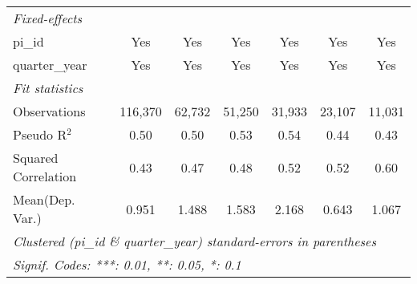 \begin{tabular}{lcccccc}
   \midrule
   \emph{Fixed-effects}\\
   pi\_id                                                     & Yes            & Yes           & Yes            & Yes            & Yes           & Yes\\  
   quarter\_year                                              & Yes            & Yes           & Yes            & Yes            & Yes           & Yes\\  
   \midrule
   \emph{Fit statistics}\\
   Observations                                               & 116,370        & 62,732        & 51,250         & 31,933         & 23,107        & 11,031\\  
   Pseudo R$^2$                                               & 0.50           & 0.50          & 0.53           & 0.54           & 0.44          & 0.43\\  
   Squared Correlation                                        & 0.43           & 0.47          & 0.48           & 0.52           & 0.52          & 0.60\\  
Mean(Dep. Var.) & 0.951 & 1.488 & 1.583 & 2.168 & 0.643 & 1.067 \\
   \midrule \midrule
   \multicolumn{7}{l}{\emph{Clustered (pi\_id \& quarter\_year) standard-errors in parentheses}}\\
   \multicolumn{7}{l}{\emph{Signif. Codes: ***: 0.01, **: 0.05, *: 0.1}}\\
\end{tabular}
\par\endgroup
